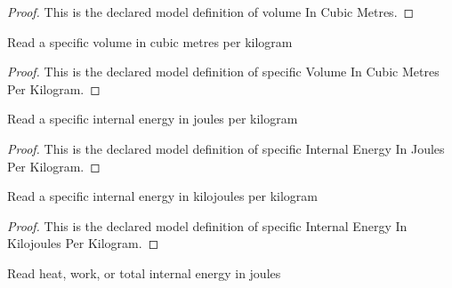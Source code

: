 \begin{proof}
  This is the declared model definition of volume In Cubic Metres.
\end{proof}
\begin{definition}
  \label{def:physics:phyx-mini-0451:phyxminiproblems-problemphyxmini0451-specificvolumeincubicmetresperkilogram}
  Read a specific volume in cubic metres per kilogram
\end{definition}
\begin{proof}
  This is the declared model definition of specific Volume In Cubic Metres Per Kilogram.
\end{proof}
\begin{definition}
  \label{def:physics:phyx-mini-0451:phyxminiproblems-problemphyxmini0451-specificinternalenergyinjoulesperkilogram}
  Read a specific internal energy in joules per kilogram
\end{definition}
\begin{proof}
  This is the declared model definition of specific Internal Energy In Joules Per Kilogram.
\end{proof}
\begin{definition}
  \label{def:physics:phyx-mini-0451:phyxminiproblems-problemphyxmini0451-specificinternalenergyinkilojoulesperkilogram}
  Read a specific internal energy in kilojoules per kilogram
\end{definition}
\begin{proof}
  This is the declared model definition of specific Internal Energy In Kilojoules Per Kilogram.
\end{proof}
\begin{definition}
  \label{def:physics:phyx-mini-0451:phyxminiproblems-problemphyxmini0451-energyinjoules}
  Read heat, work, or total internal energy in joules
\end{definition}
